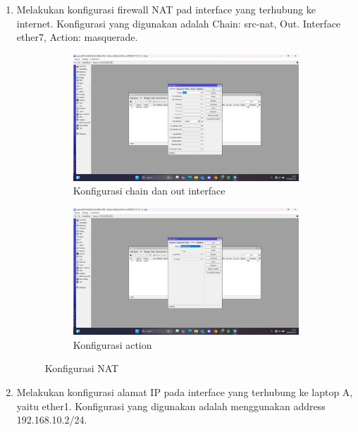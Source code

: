 \begin{enumerate}
	\item Melakukan konfigurasi firewall NAT pad interface yang terhubung ke internet. Konfigurasi yang digunakan adalah Chain: src-nat, Out. Interface ether7, Action: masquerade.
	\begin{figure}[H]
		\centering
		\begin{subfigure}[b]{0.4\linewidth}
			\centering
			\includegraphics[width=\linewidth]{P5/img/nat (1).png}
			\caption{Konfigurasi chain dan out interface\label{fig:konfigurasiR1}}
		\end{subfigure}
		\begin{subfigure}[b]{0.4\linewidth}
			\centering
			\includegraphics[width=\linewidth]{P5/img/nat (2).png}
			\caption{Konfigurasi action\label{fig:konfigurasiR2}}
		\end{subfigure}
		\caption{Konfigurasi NAT}
		\hspace{1cm}
	\end{figure}
	\item Melakukan konfigurasi alamat IP pada interface yang terhubung ke laptop A, yaitu ether1. Konfigurasi yang digunakan adalah menggunakan address 192.168.10.2/24.

\end{enumerate}

